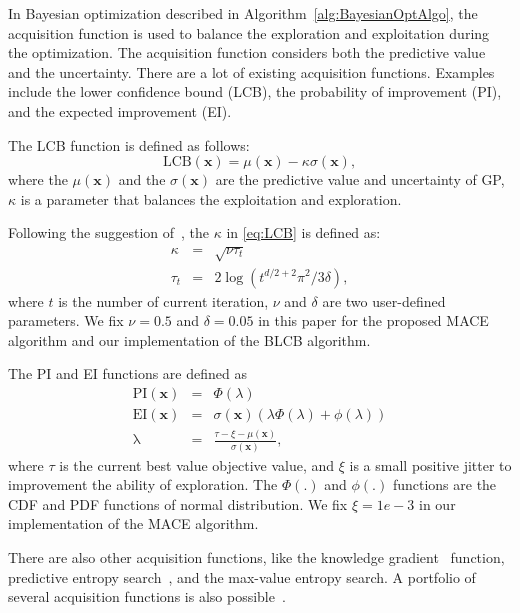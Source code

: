 In Bayesian optimization described in Algorithm~\ref{alg:BayesianOptAlgo}, the acquisition function is used to balance the exploration and exploitation during the optimization. The acquisition function considers both the predictive value and the uncertainty. There are a lot of existing acquisition functions. Examples include the lower confidence bound (LCB), the probability of improvement (PI), and the expected improvement (EI).

The LCB function is defined as follows:
\begin{equation}
    \label{eq:LCB}
    \mathrm{LCB}(\bm{x}) = \mu(\bm{x}) - \kappa \sigma(\bm{x}),
\end{equation}
where the $\mu(\bm{x})$ and the $\sigma(\bm{x})$ are the predictive value and uncertainty of GP, $\kappa$ is a parameter that balances the exploitation and exploration.

Following the suggestion of~\cite{brochu2010tutorial}, the $\kappa$ in \eqref{eq:LCB} is defined as:
\begin{equation}
    \label{eq:LCBKappa}
    \begin{array}{lll}
        \kappa &=& \sqrt{\nu \tau_t} \\
        \tau_t &=& 2 \log(t^{d/2+2} \pi^2 / 3 \delta),
    \end{array}
\end{equation}
where $t$ is the number of current iteration, $\nu$ and $\delta$ are two user-defined parameters. We fix $\nu = 0.5$ and $\delta = 0.05$ in this paper for the proposed MACE algorithm and our implementation of the BLCB algorithm.

The PI and EI functions are defined as
\begin{equation}
    \label{eq:PI_EI}
    \begin{array}{lll}
        \mathrm{PI}(\bm{x}) &=& \Phi(\lambda) \\
        \mathrm{EI}(\bm{x}) &=& \sigma(\bm{x}) (\lambda \Phi(\lambda) + \phi(\lambda))     \\
        \mathrm{\lambda}    &=& \displaystyle \frac{\tau - \xi - \mu(\bm{x})}{\sigma(\bm{x})},
    \end{array}
\end{equation}
where $\tau$ is the current best value objective value, and $\xi$ is a small positive jitter to improvement the ability of exploration. The $\Phi(.)$ and $\phi(.)$ functions are the CDF and PDF functions of normal distribution. We fix $\xi = 1e-3$ in our implementation of the MACE algorithm.


There are also other acquisition functions, like the knowledge gradient~\cite{scott2011correlated} function, predictive entropy search~\cite{hernandez2014predictive}, and the max-value entropy search\cite{wang2017max}. A portfolio of several acquisition functions is also possible~\cite{hoffman2011portfolio}.
